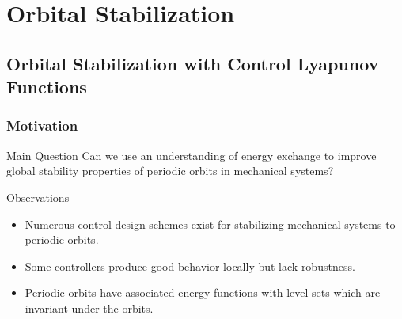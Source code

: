 \section{Orbital Stabilization}
\showtoc

\subsection{Orbital Stabilization with Control Lyapunov Functions}
\begin{frame}
  \frametitle{Motivation}
  \begin{block}{Main Question}
    Can we use an understanding of energy exchange to improve global stability properties of periodic orbits in mechanical systems?
  \end{block}

  \begin{block}{Observations}
    \begin{itemize}
    \item Numerous control design schemes exist for stabilizing mechanical systems to periodic orbits.
    \item Some controllers produce good behavior locally but lack robustness.
    \item Periodic orbits have associated energy functions with level sets which are invariant under the orbits.
    \end{itemize}
  \end{block}
\end{frame}



